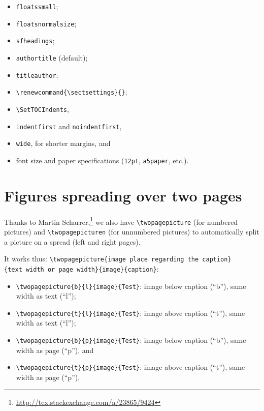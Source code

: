 \documentclass[withmarginpar,titleauthor,11pt]{mwart}
\begin{document}
\begin{multicols}{2}

\begin{itemize}
\item \texttt{floatssmall}; 
\item \texttt{floatsnormalsize}; 
\item \texttt{sfheadings};
\item \texttt{authortitle} (default); 
\item \texttt{titleauthor}; 
\item \verb|\renewcommand{\sectsettings}{}|; 
\item \verb|\SetTOCIndents|, 
\item \verb|indentfirst| and \verb|noindentfirst|, 
\item \verb|wide|, for shorter margins, and
\item font size and paper specifications (\texttt{12pt}, \texttt{a5paper}, etc.). 
\end{itemize}
\end{multicols}

\section{Figures spreading over two pages}

Thanks to Martin Scharrer,\footnote{\url{http://tex.stackexchange.com/a/23865/9424}} 
 we also have \verb|\twopagepicture| (for numbered pictures) and \verb|\twopagepicturen| (for unnumbered pictures) to automatically split a picture on a spread (left and right pages). 

It works thus: \verb|\twopagepicture{image place regarding the caption}|\\ \verb|{text width or page width}{image}{caption}|:

\begin{itemize}
	\item \verb|\twopagepicture{b}{l}{image}{Test}|: image below caption (“b”), same width as text (“l”);
	\item \verb|\twopagepicture{t}{l}{image}{Test}|: image above caption (“t”), same width as text (“l”);
	\item \verb|\twopagepicture{b}{p}{image}{Test}|: image below caption (“b”), same width as page (“p”), and 
	\item \verb|\twopagepicture{t}{p}{image}{Test}|: image above caption (“t”), same width as page (“p”),
\end{itemize}

%
%
%


\printbibliography
\end{document}
